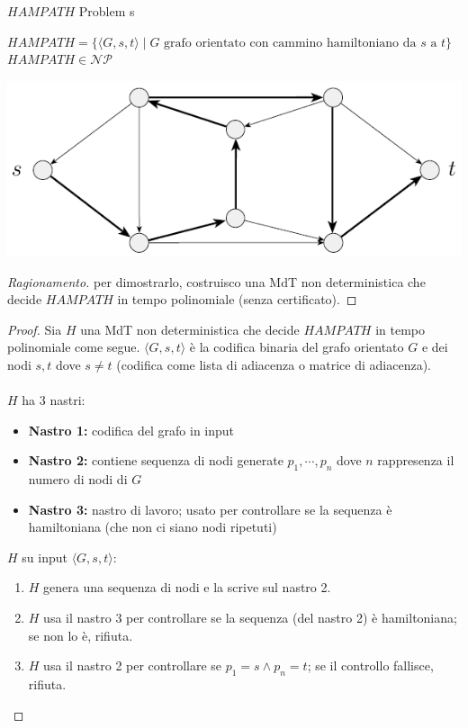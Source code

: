 \documentclass{article}  %
\theoremstyle{definition}
\newenvironment{ragionamento}[1][]
  {\begin{proof}[Ragionamento#1]\renewcommand{\qedsymbol}{}\normalfont}
  {\end{proof}}
\begin{document}
\begin{theorem}{$HAMPATH$ Problem}
	s\footnotesize
	\begin{center}
		$HAMPATH = \{\langle G,s,t \rangle \mid G \text{ grafo orientato con cammino hamiltoniano da } s \text{ a } t\}$ \\
		$HAMPATH \in \mathcal{NP}$
	\end{center}
	\begin{center}
		\includegraphics[width=0.7\linewidth]{hampath-problem.png}
	\end{center}
	\begin{ragionamento}
		per dimostrarlo, costruisco una MdT non deterministica che decide $HAMPATH$ in tempo polinomiale (senza certificato).
	\end{ragionamento}
	\begin{proof}
		Sia $H$ una MdT non deterministica che decide $HAMPATH$ in tempo polinomiale come segue. $\langle G,s,t \rangle$ è la codifica binaria
		del grafo orientato $G$ e dei nodi $s,t$ dove $s \neq t$ (codifica come lista di adiacenza o matrice di adiacenza). \\ \\
		$H$ ha 3 nastri:
		\begin{itemize}
			\item \textbf{Nastro 1:} codifica del grafo in input
			\item \textbf{Nastro 2:} contiene sequenza di nodi generate $p_1, \cdots, p_n$ dove $n$ rappresenza il numero di nodi di $G$
			\item \textbf{Nastro 3:} nastro di lavoro; usato per controllare se la sequenza è hamiltoniana (che non ci siano nodi ripetuti)
		\end{itemize}
		$H$ su input $\langle G,s,t \rangle$:
		\begin{enumerate}
			\item $H$ genera una sequenza di nodi e la scrive sul nastro 2.
			\item $H$ usa il nastro 3 per controllare se la sequenza (del nastro 2) è hamiltoniana; se non lo è, rifiuta.
			\item $H$ usa il nastro 2 per controllare se $p_1=s \land p_n=t$; se il controllo fallisce, rifiuta.

\end{enumerate}
\end{proof}
\end{theorem}
\end{document}
